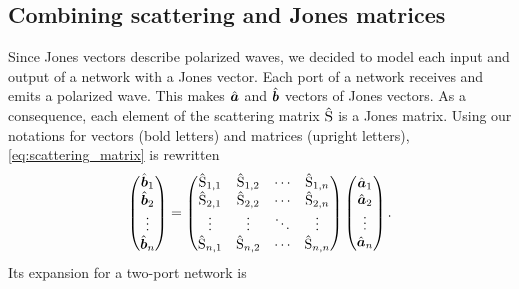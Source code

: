 \subsection{Combining scattering and Jones matrices}
Since Jones vectors describe polarized waves, we decided to model each input and output of a network with a Jones vector.
Each port of a network receives and emits a polarized wave.
This makes $\hat{\bm{a}}$ and $\hat{\bm{b}}$ vectors of Jones vectors.
As a consequence, each element of the scattering matrix $\hat{\mathrm{S}}$ is a Jones matrix.
Using our notations for vectors (bold letters) and matrices (upright letters), \cref{eq:scattering_matrix} is rewritten
\begin{equation}
        \begin{pmatrix}
            \hat{\bm{b}}_1\\
            \hat{\bm{b}}_2\\
            \vdots\\
            \hat{\bm{b}}_n
        \end{pmatrix}
    =
        \begin{pmatrix}
            \hat{\mathrm{S}}_{1, 1} & \hat{\mathrm{S}}_{1, 2} & \cdots & \hat{\mathrm{S}}_{1, n} \\
            \hat{\mathrm{S}}_{2, 1} & \hat{\mathrm{S}}_{2, 2} & \cdots & \hat{\mathrm{S}}_{2, n} \\
            \vdots   & \vdots   & \ddots & \vdots   \\
            \hat{\mathrm{S}}_{n, 1} & \hat{\mathrm{S}}_{n, 2} & \cdots & \hat{\mathrm{S}}_{n, n}
        \end{pmatrix}
        \begin{pmatrix}
            \hat{\bm{a}}_1\\
            \hat{\bm{a}}_2\\
            \vdots\\
            \hat{\bm{a}}_n
        \end{pmatrix}
    \text{.}
\end{equation}
Its expansion for a two-port network is
